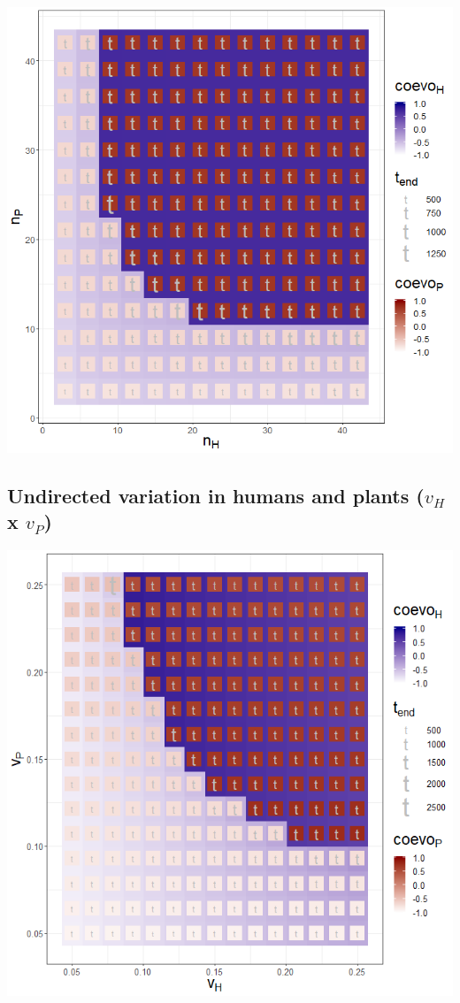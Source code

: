 \documentclass[]{book}
\begin{document}
\includegraphics[width=1\linewidth]{plots/3_twoPar-n.H-n.P_plot}

\newpage

\hypertarget{undirected-variation-in-humans-and-plants-v_h-x-v_p}{%
\subsection{\texorpdfstring{Undirected variation in humans and plants (\(v_{H}\) x \(v_{P}\))}{Undirected variation in humans and plants (v\_\{H\} x v\_\{P\})}}\label{undirected-variation-in-humans-and-plants-v_h-x-v_p}}


\includegraphics[width=1\linewidth]{plots/3_twoPar-v.H-v.P_plot}
\end{document}
